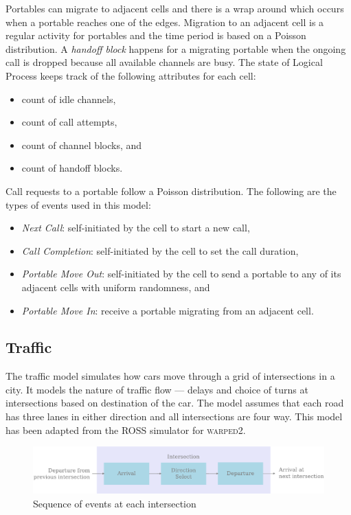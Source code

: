 \documentclass[11pt]{book}
\begin{document}
Portables can migrate to adjacent cells and there is a wrap around which occurs when a portable reaches one of
the edges.  Migration to an adjacent cell is a regular activity for portables and the time period is based on a
Poisson distribution.  A \emph{handoff block} happens for a migrating portable when the ongoing call is
dropped because all available channels are busy.  The state of Logical Process keeps track of the following
attributes for each cell:

\begin{itemize}
\item count of idle channels,
\item count of call attempts,
\item count of channel blocks, and
\item count of handoff blocks.
\end{itemize}

\noindent
Call requests to a portable follow a Poisson distribution.  The following are the types of events used in this
model:

\begin{itemize}
\item \emph{Next Call}: self-initiated by the cell to start a new call,
\item \emph{Call Completion}: self-initiated by the cell to set the call duration,
\item \emph{Portable Move Out}: self-initiated by the cell to send a portable to any of its adjacent cells
  with uniform randomness, and
\item \emph{Portable Move In}: receive a portable migrating from an adjacent cell.
\end{itemize}

\subsection{Traffic}\label{subsec:traffic}

The traffic model simulates how cars move through a grid of intersections in a city.  It models the nature of
traffic flow --- delays and choice of turns at intersections based on destination of the car.  The model
assumes that each road has three lanes in either direction and all intersections are four way.  This model has
been adapted from the \textsc{ROSS} \cite{carothers-00} simulator for \textsc{warped2}.

\begin{figure}
    \centering
    \includegraphics[width=1\textwidth]{figures/traffic_events.pdf}
    \caption{Sequence of events at each intersection}\label{fig:traffic_events}
\end{figure}
\end{document}
